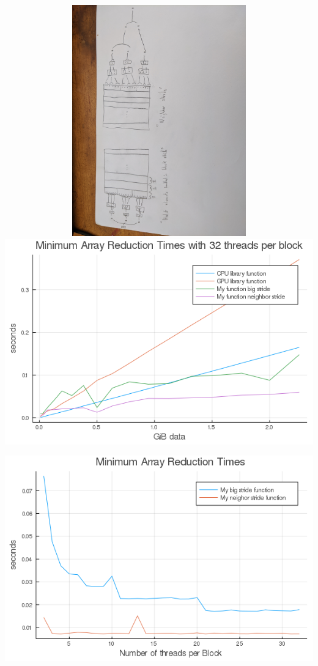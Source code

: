 \documentclass{article}
\begin{document}
\includegraphics[width=15cm, height=10cm, angle=180]{pic.jpg}
\newpage
\includegraphics[scale=.5]{stide_comp.png}

\vspace{3mm}

\includegraphics[scale=.5]{thread_comp.png}
\end{document}
